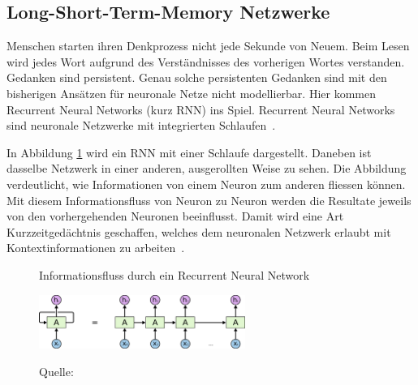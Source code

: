 \subsection{Long-Short-Term-Memory Netzwerke}

Menschen starten ihren Denkprozess nicht jede Sekunde von Neuem. Beim Lesen wird jedes Wort aufgrund des Verständnisses des vorherigen Wortes verstanden. Gedanken sind persistent. Genau solche persistenten Gedanken sind mit den bisherigen Ansätzen für neuronale Netze nicht modellierbar. Hier kommen Recurrent Neural Networks (kurz RNN) ins Spiel. Recurrent Neural Networks sind neuronale Netzwerke mit integrierten Schlaufen~\autocite{Olah2015}. 

In Abbildung \ref{rnn1} wird ein RNN mit einer Schlaufe dargestellt. Daneben ist dasselbe Netzwerk in einer anderen, ausgerollten Weise zu sehen. Die Abbildung verdeutlicht, wie Informationen von einem Neuron zum anderen fliessen können. Mit diesem Informationsfluss von Neuron zu Neuron werden die Resultate jeweils von den vorhergehenden Neuronen beeinflusst. Damit wird eine Art Kurzzeitgedächtnis geschaffen, welches dem neuronalen Netzwerk erlaubt mit Kontextinformationen zu arbeiten~\autocite{Olah2015}.
\begin{figure}[h!]
    \captionsetup{width=.9\linewidth}
    \caption{Informationsfluss durch ein Recurrent Neural Network}
    \label{rnn1}
    \centering
    \vspace{0.2cm}
    \includegraphics[width=0.6\textwidth]{graphics/rnn1.png}\\
    \vspace{0.3cm}
    \caption*{Quelle: \textcite{Olah2015}}
\end{figure}

